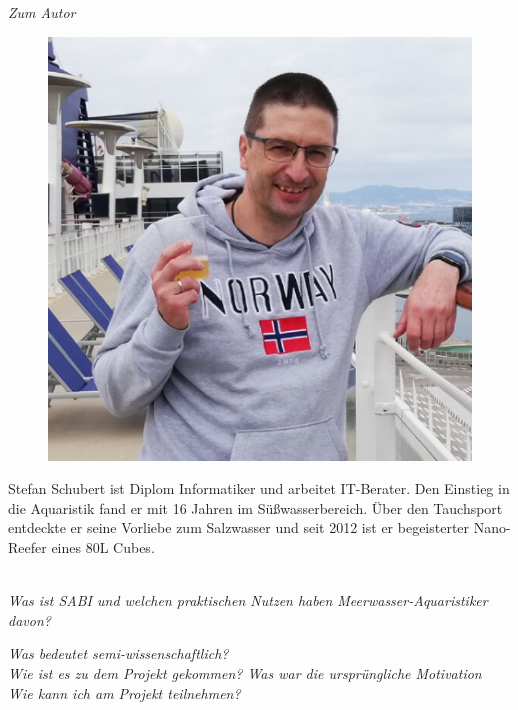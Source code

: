 \documentclass[12pt,a4paper,oneside,twocolumn]{article}
\begin{document}
\begin{flushleft}

{\it Zum Autor} \\
\begin{minipage}[t]{\linewidth}
\begin{figure}
{\includegraphics[scale=0.2]{Autor.png}}
\end{figure}
Stefan Schubert ist Diplom Informatiker und arbeitet IT-Berater. Den Einstieg in die Aquaristik fand er mit 16 Jahren im Süßwasserbereich. Über den Tauchsport entdeckte er seine Vorliebe zum Salzwasser und seit 2012 ist er begeisterter Nano-Reefer eines 80L Cubes.
\end{minipage}
\\
\vspace{0.5cm}
{\it Was ist SABI und welchen praktischen Nutzen haben Meerwasser-Aquaristiker davon?} \\
\vspace{0.5cm}


{\it Was bedeutet semi-wissenschaftlich?} \\


{\it Wie ist es zu dem Projekt gekommen? Was war die ursprüngliche Motivation } \\

{\it Wie kann ich am Projekt teilnehmen? } \\



\end{flushleft}
\end{document}

